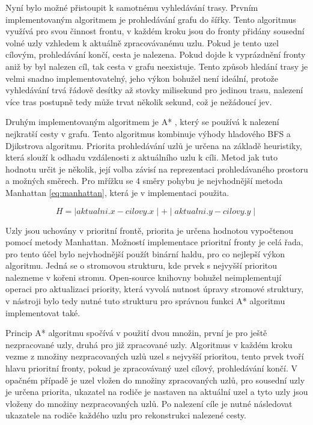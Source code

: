 \documentclass[czech,bachelor,public,dept460,male,oneside]{diploma}
\begin{document}
		Nyní bylo možné přistoupit k samotnému vyhledávání trasy. Prvním implementovaným algoritmem je prohledávání grafu do šířky. Tento algoritmus využívá pro svou činnost frontu, v každém kroku jsou do fronty přidány sousední volné uzly vzhledem k aktuálně zpracovávanému uzlu. Pokud je tento uzel cílovým, prohledávání končí, cesta je nalezena. Pokud dojde k vyprázdnění fronty aniž by byl nalezen cíl, tak cesta v grafu neexistuje. Tento způsob hledání trasy je velmi snadno implementovatelný, jeho výkon bohužel není ideální, protože vyhledávání trvá řádově desítky až stovky milisekund pro jedinou trasu, nalezení více tras postupně tedy může trvat několik sekund, což je nežádoucí jev.
		
		Druhým implementovaným algoritmem je A* \cite{aStar}, který se používá k nalezení nejkratší cesty v grafu. Tento algoritmus kombinuje výhody hladového BFS a Djikstrova algoritmu. Priorita prohledávání uzlů je určena na základě heuristiky, která slouží k odhadu vzdálenosti z aktuálního uzlu k cíli. Metod jak tuto hodnotu určit je několik, její volba závisí na reprezentaci prohledávaného prostoru a možných směrech. Pro mřížku se 4 směry pohybu je nejvhodnější metoda Manhattan \ref{eq:manhattan}, která je v implementaci použita.
		
		\begin{equation}
			H = \mid aktualni.x - cilovy.x \mid + \mid aktualni.y - cilovy.y \mid
			\label{eq:manhattan}
		\end{equation}
		
		Uzly jsou uchovány v prioritní frontě, priorita je určena hodnotou vypočtenou pomocí metody Manhattan. Možností implementace prioritní fronty je celá řada, pro tento účel bylo nejvhodnější použít binární haldu, pro co nejlepší výkon algoritmu. Jedná se o stromovou strukturu, kde prvek s nejvyšší prioritou nalezneme v kořeni stromu. Open-source knihovny bohužel neimplementují operaci pro aktualizaci priority, která vyvolá nutnost úpravy stromové struktury, v nástroji bylo tedy nutné tuto strukturu pro správnou funkci A* algoritmu implementovat také. 
		
		Princip A* algoritmu spočívá v použití dvou množin, první je pro ještě nezpracované uzly, druhá pro již zpracované uzly. Algoritmus v každém kroku vezme z množiny nezpracovaných uzlů uzel s nejvyšší prioritou, tento prvek tvoří hlavu prioritní fronty, pokud je zpracovávaný uzel cílový, prohledávání končí. V opačném případě je uzel vložen do množiny zpracovaných uzlů, pro sousední uzly je určena priorita, ukazatel na rodiče je nastaven na aktuální uzel a tyto uzly jsou vloženy do množiny nezpracovaných uzlů. Po nalezení cíle je nutné následovat ukazatele na rodiče každého uzlu pro rekonstrukci nalezené cesty. 
		
\end{document}
